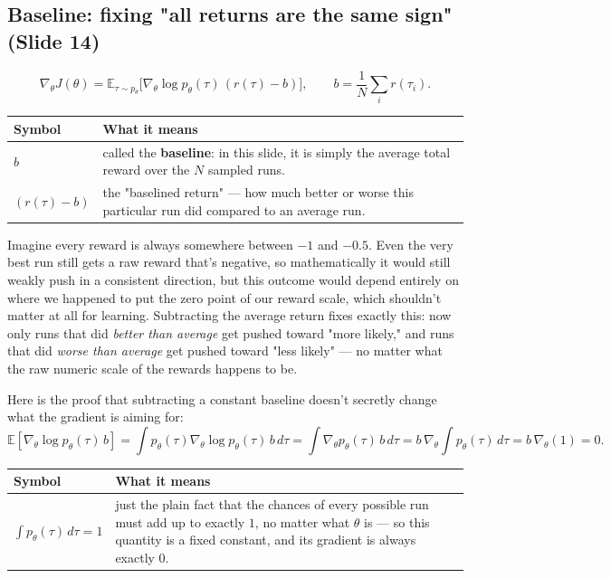 \documentclass[11pt]{article}
\begin{document}
\subsection{Baseline: fixing "all returns are the same sign" (Slide 14)}
$$\nabla_\theta J(\theta) = \mathbb{E}_{\tau\sim p_\theta}\big[\nabla_\theta\log p_\theta(\tau)\,(r(\tau)-b)\big], \qquad b = \frac{1}{N}\sum_i r(\tau_i).$$
\begin{center}
\begin{tabular}{@{} >{\raggedright\arraybackslash}p{} >{\raggedright\arraybackslash}p{} @{}}
\toprule
\textbf{Symbol} & \textbf{What it means} \\
\midrule
$b$ & called the \textbf{baseline}: in this slide, it is simply the average total reward over the $N$ sampled runs. \\
$(r(\tau)-b)$ & the "baselined return" --- how much better or worse this particular run did compared to an average run. \\
\bottomrule
\end{tabular}
\end{center}

Imagine every reward is always somewhere between $-1$ and $-0.5$. Even the very best run still gets a raw reward that's negative, so mathematically it would still weakly push in a consistent direction, but this outcome would depend entirely on where we happened to put the zero point of our reward scale, which shouldn't matter at all for learning. Subtracting the average return fixes exactly this: now only runs that did \emph{better than average} get pushed toward "more likely," and runs that did \emph{worse than average} get pushed toward "less likely" --- no matter what the raw numeric scale of the rewards happens to be.

Here is the proof that subtracting a constant baseline doesn't secretly change what the gradient is aiming for:
$$\mathbb{E}[\nabla_\theta\log p_\theta(\tau)\,b] = \int p_\theta(\tau)\nabla_\theta\log p_\theta(\tau)\,b\,d\tau = \int \nabla_\theta p_\theta(\tau)\,b\,d\tau = b\,\nabla_\theta\!\int p_\theta(\tau)\,d\tau = b\,\nabla_\theta(1) = 0.$$
\begin{center}
\begin{tabular}{@{} >{\raggedright\arraybackslash}p{} >{\raggedright\arraybackslash}p{} @{}}
\toprule
\textbf{Symbol} & \textbf{What it means} \\
\midrule
$\int p_\theta(\tau)\,d\tau = 1$ & just the plain fact that the chances of every possible run must add up to exactly $1$, no matter what $\theta$ is --- so this quantity is a fixed constant, and its gradient is always exactly $0$. \\
\bottomrule
\end{tabular}
\end{center}
\end{document}

